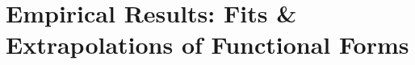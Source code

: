 \documentclass{article} %
\begin{document}



\clearpage

\vspace*{-13.4mm}


\newcommand{\framedtext}[1]{%
\par%
\noindent\fcolorbox{Magenta2}{white}{
    \parbox{\dimexpr\linewidth-2.18\fboxsep-2\fboxrule}{#1}%
}%
}

%
\section{Empirical Results: Fits \& Extrapolations of Functional Forms}
\label{section:functional_form_fits}
\end{document}
